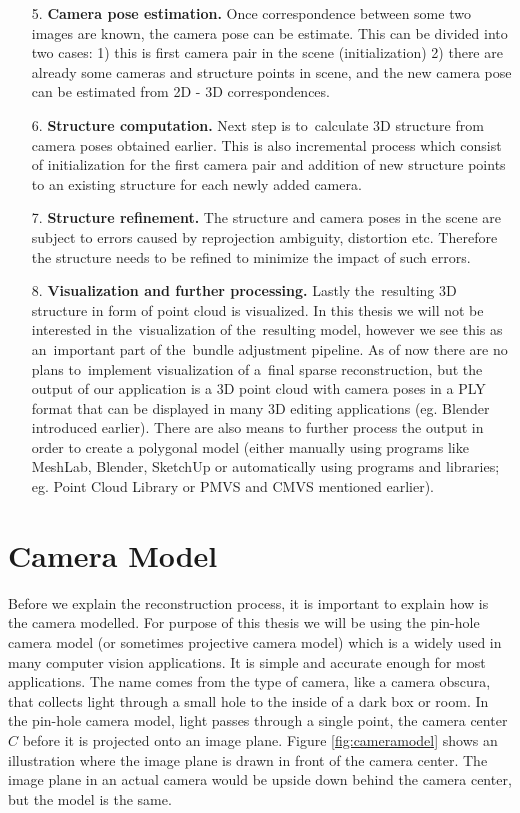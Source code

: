 \begin{itemize}
	\item[5.] \textbf{Camera pose estimation.} Once correspondence between some two images are known, the camera pose can be estimate. This can be divided into two cases: 1) this is first camera pair in the scene (initialization) 2) there are already some cameras and structure points in scene, and the new camera pose can be estimated from 2D - 3D correspondences.
	\item[6.] \textbf{Structure computation.} Next step is to~calculate 3D structure from camera poses obtained earlier. This is also incremental process which consist of initialization for the first camera pair and addition of new structure points to an existing structure for each newly added camera.
	\item[7.] \textbf{Structure refinement.} The structure and camera poses in the scene are subject to errors caused by reprojection ambiguity, distortion etc. Therefore the structure needs to be refined to minimize the impact of such errors.
	\item[8.] \textbf{Visualization and further processing.} Lastly the~resulting 3D structure in form of point cloud is visualized. In this thesis we will not be interested in the~visualization of the~resulting model, however we see this as an~important part of the~bundle adjustment pipeline. As of now there are no plans to~implement visualization of a~final sparse reconstruction, but the output of our application is a 3D point cloud with camera poses in a PLY format that can be displayed in many 3D editing applications (eg. Blender introduced earlier). There are also means to further process the output in order to create a polygonal model (either manually using programs like MeshLab, Blender, SketchUp or automatically using programs and libraries; eg. Point Cloud Library \cite{www:pcl} or PMVS and CMVS mentioned earlier). 
\end{itemize}

\section{Camera Model}
Before we explain the reconstruction process, it is important to explain how is the camera modelled. For purpose of this thesis we will be using the pin-hole camera model (or sometimes projective camera model) which is a widely used in many computer vision applications. It is simple and accurate enough for most applications. The name comes from the type of camera, like a camera obscura, that collects light through a small hole to the inside of a dark box or room. In the pin-hole camera model, light passes through a single point, the camera center $C$ before it is projected onto an image plane. Figure \ref{fig:cameramodel} shows an illustration where the image plane is drawn in front of the camera center. The image plane in an actual camera would be upside down behind the camera center, but the model is the same.

